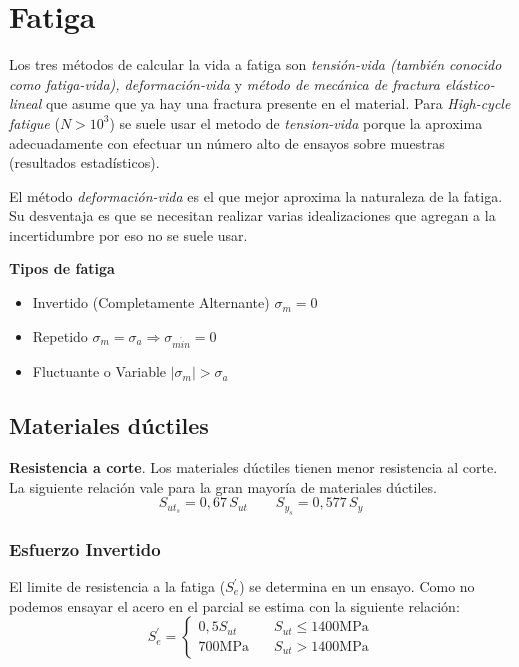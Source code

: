 \documentclass[twocolumn,10pt]{article}
\begin{document}
\maketitle

\section{Fatiga}
Los tres métodos de calcular la vida a fatiga son \emph{tensión-vida (también conocido como fatiga-vida), deformación-vida} y \emph{método de mecánica de fractura elástico-lineal} que asume que ya hay una fractura presente en el material. Para \emph{High-cycle fatigue} ($N>10^3$) se suele usar el metodo de \emph{tension-vida} porque la aproxima adecuadamente con efectuar un número alto de ensayos sobre muestras (resultados estadísticos). \par
El método \emph{deformación-vida} es el que mejor aproxima la naturaleza de la fatiga. Su desventaja es que se necesitan realizar varias idealizaciones que agregan a la incertidumbre por eso no se suele usar.\par

\textbf{Tipos de fatiga}
\begin{itemize}
    \item Invertido (Completamente Alternante) $\sigma_m=0$
    \item Repetido $\sigma_m=\sigma_a\Rightarrow \sigma_{m\acute{i}n}=0$
    \item Fluctuante o Variable $|\sigma_m|>\sigma_a$
\end{itemize}

\subsection{Materiales dúctiles}
\textbf{Resistencia a corte}. Los materiales dúctiles tienen menor resistencia al corte. La siguiente relación vale para la gran mayoría de materiales dúctiles.
$$S_{ut_s}=0,67\,S_{ut}\qquad S_{y_s}=0,577\,S_y $$

\subsubsection{Esfuerzo Invertido}
El limite de resistencia a la fatiga ($S_e^\prime$) se determina en un ensayo. Como no podemos ensayar el acero en el parcial se estima con la siguiente relación:
\[ S_e^\prime =
  \begin{cases}
    0,5S_{ut}   & \quad S_{ut}\leq 1400 \si{\mega \pascal}\\
    700\si{\mega \pascal}    & \quad S_{ut}>1400 \si{\mega \pascal} 
  \end{cases}
\]
\end{document}
